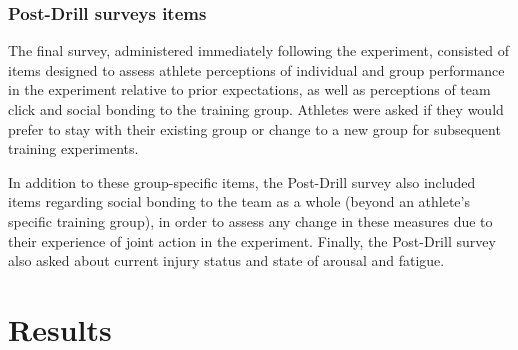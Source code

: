 \begin{CJK}{UTF8}{gbsn}


\subsubsection{Post-Drill surveys items\label{app9:surveyItemsPost}}
The final survey, administered immediately following the experiment, consisted of items designed to assess athlete perceptions of individual and group performance in the experiment relative to prior expectations, as well as perceptions of team click and social bonding to the training group.  Athletes were asked if they would prefer to stay with their existing group or change to a new group for subsequent training experiments.

In addition to these group-specific items, the Post-Drill survey also included items regarding social bonding to the team as a whole (beyond an athlete's specific training group), in order to assess any change in these measures due to their experience of joint action in the experiment.  Finally, the Post-Drill survey also asked about current injury status and state of arousal and fatigue.



\section{\label{app9:results}Results}



\end{CJK}
